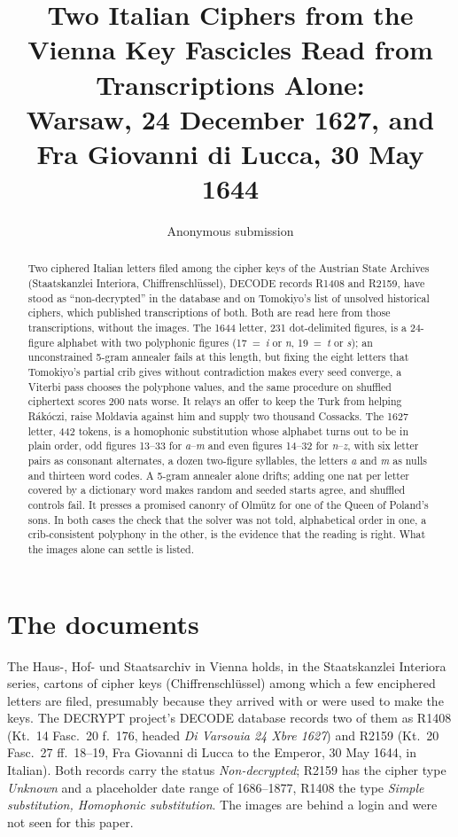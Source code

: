\documentclass[11pt]{article}
\title{Two Italian Ciphers from the Vienna Key Fascicles Read from Transcriptions Alone: \\ Warsaw, 24 December 1627, and Fra Giovanni di Lucca, 30 May 1644}
\author{Anonymous submission}
\date{}
\begin{document}
\maketitle

\begin{abstract}
Two ciphered Italian letters filed among the cipher keys of the Austrian State Archives (Staatskanzlei Interiora, Chiffrenschl\"ussel), DECODE records R1408 and R2159, have stood as ``non-decrypted'' in the database and on Tomokiyo's list of unsolved historical ciphers, which published transcriptions of both. Both are read here from those transcriptions, without the images. The 1644 letter, 231 dot-delimited figures, is a 24-figure alphabet with two polyphonic figures (17~=~\emph{i} or \emph{n}, 19~=~\emph{t} or \emph{s}); an unconstrained 5-gram annealer fails at this length, but fixing the eight letters that Tomokiyo's partial crib gives without contradiction makes every seed converge, a Viterbi pass chooses the polyphone values, and the same procedure on shuffled ciphertext scores 200 nats worse. It relays an offer to keep the Turk from helping R\'ak\'oczi, raise Moldavia against him and supply two thousand Cossacks. The 1627 letter, 442 tokens, is a homophonic substitution whose alphabet turns out to be in plain order, odd figures 13--33 for \emph{a}--\emph{m} and even figures 14--32 for \emph{n}--\emph{z}, with six letter pairs as consonant alternates, a dozen two-figure syllables, the letters \emph{a} and \emph{m} as nulls and thirteen word codes. A 5-gram annealer alone drifts; adding one nat per letter covered by a dictionary word makes random and seeded starts agree, and shuffled controls fail. It presses a promised canonry of Olm\"utz for one of the Queen of Poland's sons. In both cases the check that the solver was not told, alphabetical order in one, a crib-consistent polyphony in the other, is the evidence that the reading is right. What the images alone can settle is listed.
\end{abstract}

\section{The documents}

The Haus-, Hof- und Staatsarchiv in Vienna holds, in the Staatskanzlei Interiora series, cartons of cipher keys (Chiffrenschl\"ussel) among which a few enciphered letters are filed, presumably because they arrived with or were used to make the keys. The DECRYPT project's DECODE database \cite{Megyesi:2020,DECODE} records two of them as R1408 (Kt.~14 Fasc.~20 f.~176, headed \emph{Di Varsouia 24 Xbre 1627}) and R2159 (Kt.~20 Fasc.~27 ff.~18--19, Fra Giovanni di Lucca to the Emperor, 30 May 1644, in Italian). Both records carry the status \emph{Non-decrypted}; R2159 has the cipher type \emph{Unknown} and a placeholder date range of 1686--1877, R1408 the type \emph{Simple substitution, Homophonic substitution}. The images are behind a login and were not seen for this paper.
\end{document}
